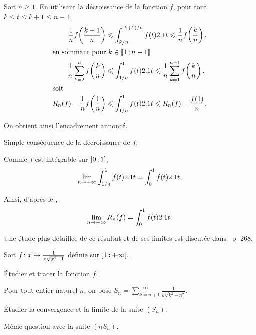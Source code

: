 \begin{elemsolution}
\begin{reponses}
\item Soit $n \geqslant 1$. En utilisant la décroissance de la fonction $f$, pour tout $k \leqslant t \leqslant k + 1 \leqslant n-1$,
\begin{align*}
\frac{1}{n} f\mathopen{}\left(\frac{k+1}{n}\right) &\leqslant \int_{k/n}^{(k+1)/n} f(t) \d t \leqslant \frac{1}{n} f\mathopen{}\left(\frac{k}{n}\right),\\
\intertext{en sommant pour $k \in \interent{1}{n-1}$}
\frac{1}{n} \sum\limits_{k=2}^{n} f\mathopen{}\left(\frac{k}{n}\right) &\leqslant \displaystyle\int_{1/n}^1 f(t) \d t \leqslant \frac{1}{n} \sum\limits_{k=1}^{n-1} f\mathopen{}\left(\frac{k}{n}\right),\\
\intertext{soit}
R_n(f) - \frac{1}{n} f\mathopen{}\left(\frac{1}{n}\right) &\leqslant \displaystyle\int_{1/n}^1 f(t) \d t \leqslant R_n(f) - \frac{f(1)}{n}.
\end{align*}

On obtient ainsi l'encadrement annoncé.

\item Simple conséquence de la décroissance de $f$.

\item Comme $f$ est intégrable sur $\interof{0}{1}$,
\[
\lim\limits_{n\to+\infty} \displaystyle\int_{1/n}^1 f(t) \d t = \displaystyle\int_0^1 f(t) \d t.
\]

\item Ainsi, d'après le ,
\[
\lim\limits_{n\to+\infty} R_n(f) = \displaystyle\int_0^1 f(t) \d t.
\]
\end{reponses}
\end{elemsolution}

\begin{remarque}
Une étude plus détaillée de ce résultat et de ses limites est discutée dans~\cite{truc2019} p. 268.
\end{remarque}


\begin{exercice}
Soit $\fonctionligne[f]{x}{\frac{1}{x \sqrt{x^2 - 1}}}$ définie sur $\interoo{1}{+\infty}$.
\begin{questions}
\item Étudier et tracer la fonction $f$.
\end{questions}
Pour tout entier naturel $n$, on pose $S_n = \sum\limits_{k=n+1}^{+\infty} \frac{1}{k \sqrt{k^2 - n^2}}$.
\begin{questions}[resume]
\item Étudier la convergence et la limite de la suite $(S_n)$.

\item Même question avec la suite $(n S_n)$.
\end{questions}
\end{exercice}

